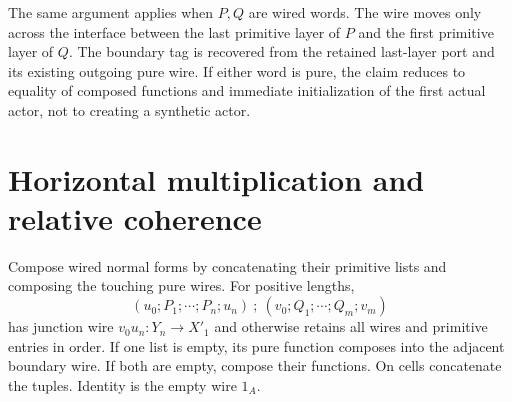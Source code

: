 \documentclass[11pt]{article}
\begin{document}
The same argument applies when $P,Q$ are wired words. The wire moves only across the interface between the last primitive layer of $P$ and the first primitive layer of $Q$. The boundary tag is recovered from the retained last-layer port and its existing outgoing pure wire. If either word is pure, the claim reduces to equality of composed functions and immediate initialization of the first actual actor, not to creating a synthetic actor.

\section{Horizontal multiplication and relative coherence}
Compose wired normal forms by concatenating their primitive lists and composing the touching pure wires. For positive lengths,
\[
 (u_0;P_1;\cdots;P_n;u_n)\ ;\
 (v_0;Q_1;\cdots;Q_m;v_m)
\]
has junction wire $v_0u_n:Y_n\to X'_1$ and otherwise retains all wires and primitive entries in order. If one list is empty, its pure function composes into the adjacent boundary wire. If both are empty, compose their functions. On cells concatenate the tuples. Identity is the empty wire $1_A$.
\end{document}
